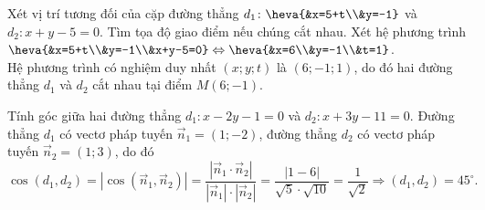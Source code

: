 \begin{bt}%
	Xét vị trí tương đối của cặp đường thẳng $d_1\colon \heva{&x=5+t\\&y=-1}$ và $d_2\colon x+y-5=0$. Tìm tọa độ giao điểm nếu chúng cắt nhau.
	\loigiai
	{Xét hệ phương trình $\heva{&x=5+t\\&y=-1\\&x+y-5=0} \Leftrightarrow \heva{&x=6\\&y=-1\\&t=1}$.\\
		Hệ phương trình có nghiệm duy nhất $(x;y;t)$ là $(6;-1;1)$, do đó hai đường thẳng $d_1$ và $d_2$ cắt nhau tại điểm $M(6;-1)$.}
\end{bt}






\begin{bt}%
	Tính góc giữa hai đường thẳng $d_1\colon x-2y-1=0$ và $d_2\colon x+3y-11=0$.
	\loigiai
	{Đường thẳng $d_1$ có vectơ pháp tuyến $\vec{n}_1=(1;-2)$, đường thẳng $d_2$ có vectơ pháp tuyến $\vec{n}_2=(1;3)$, do đó
		$$\cos(d_1,d_2)=\left|\cos\left(\vec{n}_1,\vec{n}_2\right)\right|=\dfrac{\left|\vec{n}_1\cdot \vec{n}_2\right|}{\left|\vec{n}_1\right|\cdot\left|\vec{n}_2\right|} = \dfrac{|1-6|}{\sqrt{5}\cdot\sqrt{10}}=\dfrac{1}{\sqrt{2}} \Rightarrow (d_1,d_2)=45^\circ.$$}
\end{bt}

